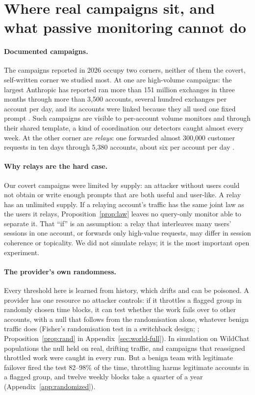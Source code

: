 \section{Where real campaigns sit, and what passive monitoring cannot do}
\label{sec:world}

\paragraph{Documented campaigns.} The campaigns reported in 2026 occupy two corners, neither of them the covert, self-written corner we studied most. At one are high-volume campaigns: the largest Anthropic has reported ran more than 151 million exchanges in three months through more than 3{,}500 accounts, several hundred exchanges per account per day, and its accounts were linked because they all used one fixed prompt \citep{anthropic2026threat}. Such campaigns are visible to per-account volume monitors and through their shared template, a kind of coordination our detectors caught almost every week. At the other corner are \emph{relays}: one forwarded almost 300{,}000 customer requests in ten days through 5{,}380 accounts, about six per account per day \citep{anthropic2026threat}.

\paragraph{Why relays are the hard case.} Our covert campaigns were limited by supply: an attacker without users could not obtain or write enough prompts that are both useful and user-like. A relay has an unlimited supply. If a relaying account's traffic has the same joint law as the users it relays, Proposition~\ref{prop:law} leaves no query-only monitor able to separate it. That ``if'' is an assumption: a relay that interleaves many users' sessions in one account, or forwards only high-value requests, may differ in session coherence or topicality. We did not simulate relays; it is the most important open experiment.

\paragraph{The provider's own randomness.} Every threshold here is learned from history, which drifts and can be poisoned. A provider has one resource no attacker controls: if it throttles a flagged group in randomly chosen time blocks, it can test whether the work fails over to other accounts, with a null that follows from the randomisation alone, whatever benign traffic does (Fisher's randomisation test in a switchback design; \citealp{fisher1935design,bojinov2023design}; Proposition~\ref{prop:rand} in Appendix~\ref{sec:world-full}). In simulation on WildChat populations the null held on real, drifting traffic, and campaigns that reassigned throttled work were caught in every run. But a benign team with legitimate failover fired the test 82--98\% of the time, throttling harms legitimate accounts in a flagged group, and twelve weekly blocks take a quarter of a year (Appendix~\ref{app:randomized}).
